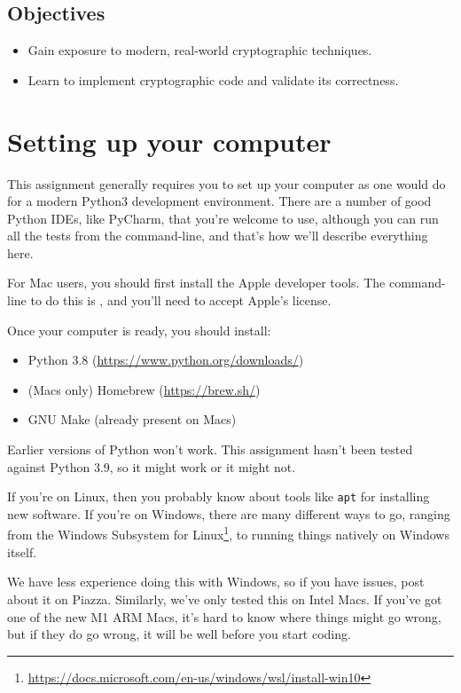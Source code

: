 \documentclass[letterpaper,12pt]{article}
\begin{document}
\vspace{-6pt}
\subsection{Objectives}
\begin{itemize}\itemsep=0ex
\item Gain exposure to modern, real-world cryptographic techniques.
\item Learn to implement cryptographic code and validate its correctness.
\end{itemize}

\newpage

\section{Setting up your computer}
This assignment generally requires you to set up your computer as one
would do for a modern Python3 development environment. There are a
number of good Python IDEs, like PyCharm, that you're welcome to use,
although you can run all the tests from the command-line, and that's
how we'll describe everything here.

For Mac users, you should first install the Apple developer tools.
The command-line to do this is ,
and you'll need to accept Apple's license.

Once your computer is ready, you should install:
\begin{itemize}
\item Python 3.8 (\url{https://www.python.org/downloads/})
\item (Macs only) Homebrew (\url{https://brew.sh/})
\item GNU Make (already present on Macs)
\end{itemize}

Earlier versions of Python won't work. This assignment hasn't been
tested against Python 3.9, so it might work or it might not.

If you're on Linux, then you probably know about tools like {\tt apt}
for installing new software. If you're on Windows, there are many
different ways to go, ranging from the Windows Subsystem for
Linux\footnote{\url{https://docs.microsoft.com/en-us/windows/wsl/install-win10}},
to running things natively on Windows itself.

We have less experience doing this with Windows, so if you have
issues, post about it on Piazza. Similarly, we've only tested this on
Intel Macs. If you've got one of the new M1 ARM Macs, it's hard to
know where things might go wrong, but if they do go wrong, it will be
well before you start coding.
\end{document}
